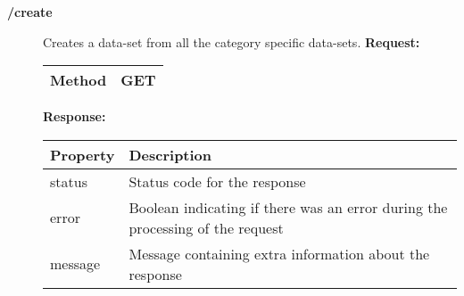 \begin{description}
\item[{\large \textbf{/create}}]
Creates a data-set from all the category specific data-sets.
\newline
\newline
\textbf{Request:}
\newline
\newline
\begin{tabular}{ | l | l |}
\hline
Method & GET\\ \hline
\end{tabular}
\newline
\newline
\textbf{Response:}
\newline
\newline
\resizebox{\textwidth}{!} {
\begin{tabular}{ | l | l |}
\hline
\textbf{Property} & \textbf{Description}\\ \hline
status & Status code for the response\\ \hline
error & Boolean indicating if there was an error during the processing of the request\\ \hline
message & Message containing extra information about the response\\ \hline
\end{tabular}}


\end{description}
